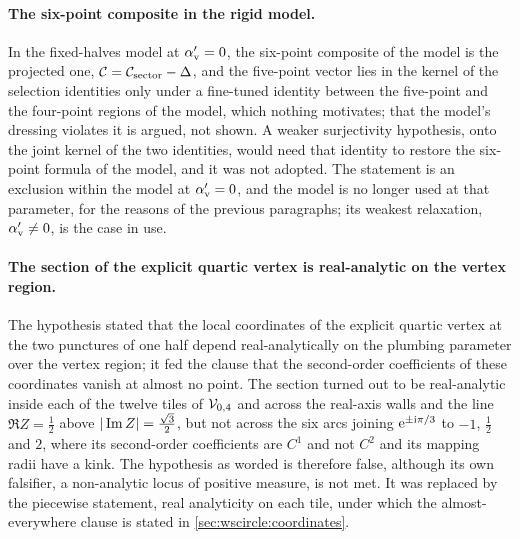 \paragraph{The six-point composite in the rigid model.}
In the fixed-halves model at $\alpha'_{\rm v} = 0$, the six-point composite of the model is the projected one, ${\mathcal{C}} = {\mathcal{C}}_{\rm sector} - \Delta$, and the five-point vector lies in the kernel of the selection identities only under a fine-tuned identity between the five-point and the four-point regions of the model, which nothing motivates; that the model's dressing violates it is argued, not shown.
A weaker surjectivity hypothesis, onto the joint kernel of the two identities, would need that identity to restore the six-point formula of the model, and it was not adopted.
The statement is an exclusion within the model at $\alpha'_{\rm v} = 0$, and the model is no longer used at that parameter, for the reasons of the previous paragraphs; its weakest relaxation, $\alpha'_{\rm v} \neq 0$, is the case in use.

\paragraph{The section of the explicit quartic vertex is real-analytic on the vertex region.}
The hypothesis stated that the local coordinates of the explicit quartic vertex at the two punctures of one half depend real-analytically on the plumbing parameter over the vertex region; it fed the clause that the second-order coefficients of these coordinates vanish at almost no point.
The section turned out to be real-analytic inside each of the twelve tiles of ${\mathcal{V}}_{0, 4}$ and across the real-axis walls and the line $\Re Z = \tfrac{1}{2}$ above ${|\operatorname{Im} Z|} = \tfrac{\sqrt{3}}{2}$, but not across the six arcs joining $\mathrm{e}^{\pm \mathrm{i} \pi / 3}$ to $-1$, $\tfrac{1}{2}$ and $2$, where its second-order coefficients are $C^1$ and not $C^2$ and its mapping radii have a kink.
The hypothesis as worded is therefore false, although its own falsifier, a non-analytic locus of positive measure, is not met.
It was replaced by the piecewise statement, real analyticity on each tile, under which the almost-everywhere clause is stated in \cref{sec:wscircle:coordinates}.

